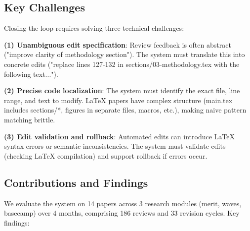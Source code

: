 \subsection{Key Challenges}

Closing the loop requires solving three technical challenges:

\textbf{(1) Unambiguous edit specification}: Review feedback is often abstract ("improve clarity of methodology section"). The system must translate this into concrete edits ("replace lines 127-132 in sections/03-methodology.tex with the following text...").

\textbf{(2) Precise code localization}: The system must identify the exact file, line range, and text to modify. LaTeX papers have complex structure (main.tex includes sections/*, figures in separate files, macros, etc.), making naive pattern matching brittle.

\textbf{(3) Edit validation and rollback}: Automated edits can introduce LaTeX syntax errors or semantic inconsistencies. The system must validate edits (checking LaTeX compilation) and support rollback if errors occur.

\subsection{Contributions and Findings}

We evaluate the system on 14 papers across 3 research modules (merit, waves, basecamp) over 4 months, comprising 186 reviews and 33 revision cycles. Key findings:

